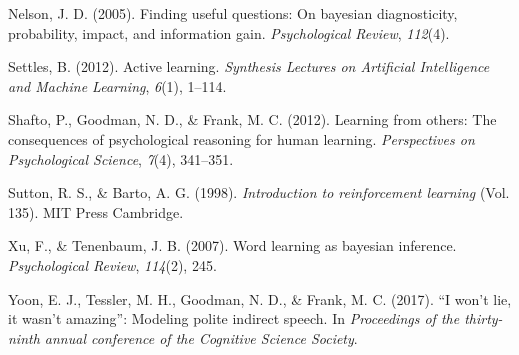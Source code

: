 \documentclass[10pt, letterpaper]{article}
\begin{document}
\hypertarget{ref-nelson2005}{}
Nelson, J. D. (2005). Finding useful questions: On bayesian
diagnosticity, probability, impact, and information gain.
\emph{Psychological Review}, \emph{112}(4).

\hypertarget{ref-settles2012active}{}
Settles, B. (2012). Active learning. \emph{Synthesis Lectures on
Artificial Intelligence and Machine Learning}, \emph{6}(1), 1--114.

\hypertarget{ref-shafto2012learning}{}
Shafto, P., Goodman, N. D., \& Frank, M. C. (2012). Learning from
others: The consequences of psychological reasoning for human learning.
\emph{Perspectives on Psychological Science}, \emph{7}(4), 341--351.

\hypertarget{ref-sutton1998}{}
Sutton, R. S., \& Barto, A. G. (1998). \emph{Introduction to
reinforcement learning} (Vol. 135). MIT Press Cambridge.

\hypertarget{ref-xu2007}{}
Xu, F., \& Tenenbaum, J. B. (2007). Word learning as bayesian inference.
\emph{Psychological Review}, \emph{114}(2), 245.

\hypertarget{ref-yoon2017}{}
Yoon, E. J., Tessler, M. H., Goodman, N. D., \& Frank, M. C. (2017). ``I
won't lie, it wasn't amazing'': Modeling polite indirect speech. In
\emph{Proceedings of the thirty-ninth annual conference of the Cognitive
Science Society}.
\end{document}
